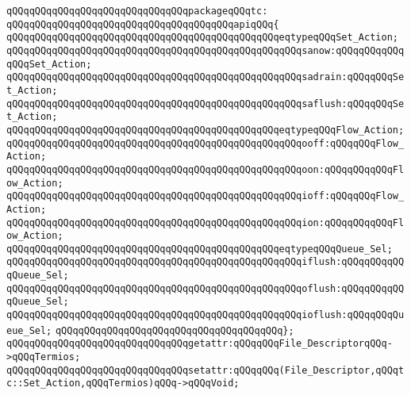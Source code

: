 \newline
\verb|qQQqqQQqqQQqqQQqqQQqqQQqqQQqqQQqpackageqQQqtc:|\newline
\verb|qQQqqQQqqQQqqQQqqQQqqQQqqQQqqQQqqQQqqQQqapiqQQq{|\newline
\verb|qQQqqQQqqQQqqQQqqQQqqQQqqQQqqQQqqQQqqQQqqQQqqQQqeqtypeqQQqSet_Action;|\newline
\newline
\verb|qQQqqQQqqQQqqQQqqQQqqQQqqQQqqQQqqQQqqQQqqQQqqQQqqQQqsanow:qQQqqQQqqQQqqQQqSet_Action;|\newline
\verb|qQQqqQQqqQQqqQQqqQQqqQQqqQQqqQQqqQQqqQQqqQQqqQQqqQQqsadrain:qQQqqQQqSet_Action;|\newline
\verb|qQQqqQQqqQQqqQQqqQQqqQQqqQQqqQQqqQQqqQQqqQQqqQQqqQQqsaflush:qQQqqQQqSet_Action;|\newline
\newline
\verb|qQQqqQQqqQQqqQQqqQQqqQQqqQQqqQQqqQQqqQQqqQQqqQQqeqtypeqQQqFlow_Action;|\newline
\newline
\verb|qQQqqQQqqQQqqQQqqQQqqQQqqQQqqQQqqQQqqQQqqQQqqQQqqQQqooff:qQQqqQQqFlow_Action;|\newline
\verb|qQQqqQQqqQQqqQQqqQQqqQQqqQQqqQQqqQQqqQQqqQQqqQQqqQQqoon:qQQqqQQqqQQqFlow_Action;|\newline
\verb|qQQqqQQqqQQqqQQqqQQqqQQqqQQqqQQqqQQqqQQqqQQqqQQqqQQqioff:qQQqqQQqFlow_Action;|\newline
\verb|qQQqqQQqqQQqqQQqqQQqqQQqqQQqqQQqqQQqqQQqqQQqqQQqqQQqion:qQQqqQQqqQQqFlow_Action;|\newline
\newline
\verb|qQQqqQQqqQQqqQQqqQQqqQQqqQQqqQQqqQQqqQQqqQQqqQQqeqtypeqQQqQueue_Sel;|\newline
\newline
\verb|qQQqqQQqqQQqqQQqqQQqqQQqqQQqqQQqqQQqqQQqqQQqqQQqqQQqiflush:qQQqqQQqqQQqQueue_Sel;|\newline
\verb|qQQqqQQqqQQqqQQqqQQqqQQqqQQqqQQqqQQqqQQqqQQqqQQqqQQqoflush:qQQqqQQqqQQqQueue_Sel;|\newline
\verb|qQQqqQQqqQQqqQQqqQQqqQQqqQQqqQQqqQQqqQQqqQQqqQQqqQQqioflush:qQQqqQQqQueue_Sel;|\newline
\verb|qQQqqQQqqQQqqQQqqQQqqQQqqQQqqQQqqQQqqQQq};|\newline
\newline
\verb|qQQqqQQqqQQqqQQqqQQqqQQqqQQqqQQqgetattr:qQQqqQQqFile_DescriptorqQQq->qQQqTermios;|\newline
\verb|qQQqqQQqqQQqqQQqqQQqqQQqqQQqqQQqsetattr:qQQqqQQq(File_Descriptor,qQQqtc::Set_Action,qQQqTermios)qQQq->qQQqVoid;|\newline
